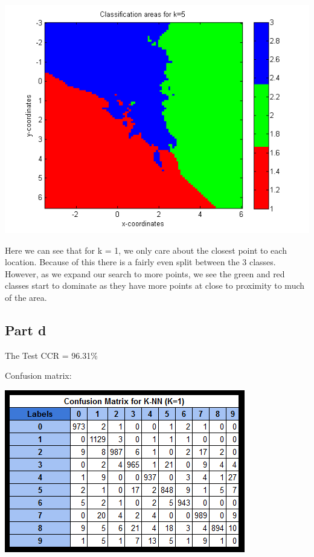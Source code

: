 \documentclass[paper=a4, fontsize=11pt]{scrartcl} %
\numberwithin{equation}{section} %
\numberwithin{figure}{section} %
\numberwithin{table}{section} %
\begin{document}
	\includegraphics{3c_k5}
	
	Here we can see that for k = 1, we only care about the closest point to each location. Because of this there is a fairly even split between the 3 classes. However, as we expand our search to more points, we see the green and red classes start to dominate as they have more points at close to proximity to much of the area.
	
	\subsection{Part d}
	The Test CCR = 96.31\%
	
	Confusion matrix:
	
	\includegraphics{3d_confusion_matrix}
	
	
\end{document}
